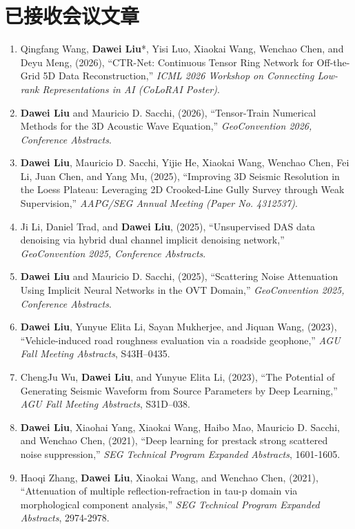 \documentclass[11pt,a4paper]{article}
\begin{document}
\section{已接收会议文章}
\begin{enumerate}[leftmargin=1.5em, itemsep=0pt, topsep=2pt]
    \item Qingfang Wang, \textbf{Dawei Liu}*, Yisi Luo, Xiaokai Wang, Wenchao Chen, and Deyu Meng, (2026), ``CTR-Net: Continuous Tensor Ring Network for Off-the-Grid 5D Data Reconstruction,'' \textit{ICML 2026 Workshop on Connecting Low-rank Representations in AI (CoLoRAI Poster)}.
    \item \textbf{Dawei Liu} and Mauricio D. Sacchi, (2026), ``Tensor-Train Numerical Methods for the 3D Acoustic Wave Equation,'' {\em GeoConvention 2026, Conference Abstracts}.
    \item \textbf{Dawei Liu}, Mauricio D. Sacchi, Yijie He, Xiaokai Wang, Wenchao Chen, Fei Li, Juan Chen, and Yang Mu, (2025), ``Improving 3D Seismic Resolution in the Loess Plateau: Leveraging 2D Crooked-Line Gully Survey through Weak Supervision,'' {\em AAPG/SEG Annual Meeting (Paper No. 4312537)}.
    \item Ji Li, Daniel Trad, and \textbf{Dawei Liu}, (2025), ``Unsupervised DAS data denoising via hybrid dual channel implicit denoising network,'' {\em GeoConvention 2025, Conference Abstracts}.
    \item \textbf{Dawei Liu} and Mauricio D. Sacchi, (2025), ``Scattering Noise Attenuation Using Implicit Neural Networks in the OVT Domain,'' {\em GeoConvention 2025, Conference Abstracts}.
    \item \textbf{Dawei Liu}, Yunyue Elita Li, Sayan Mukherjee, and Jiquan Wang, (2023), ``Vehicle-induced road roughness evaluation via a roadside geophone,'' {\em AGU Fall Meeting Abstracts}, S43H--0435.
    \item ChengJu Wu, \textbf{Dawei Liu}, and Yunyue Elita Li, (2023), ``The Potential of Generating Seismic Waveform from Source Parameters by Deep Learning,'' {\em AGU Fall Meeting Abstracts}, S31D--038.
    \item \textbf{Dawei Liu}, Xiaohai Yang, Xiaokai Wang, Haibo Mao, Mauricio D. Sacchi, and Wenchao Chen, (2021), ``Deep learning for prestack strong scattered noise suppression,'' {\em SEG Technical Program Expanded Abstracts}, 1601-1605.
    \item Haoqi Zhang, \textbf{Dawei Liu}, Xiaokai Wang, and Wenchao Chen, (2021), ``Attenuation of multiple reflection-refraction in tau-p domain via morphological component analysis,'' {\em SEG Technical Program Expanded Abstracts}, 2974-2978.

\end{enumerate}
\end{document}

